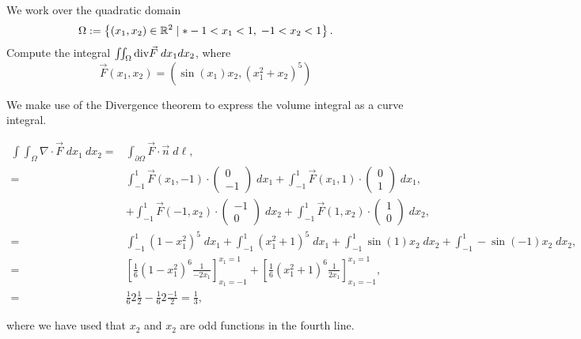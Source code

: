 \documentclass[11pt]{article}
\begin{document}
\begin{exercise}
    We work over the quadratic domain 
    \[
        \Omega := \left\{ (x_1,x_2) \in \bbR^{2} \suchthat* -1 < x_1 < 1, \; -1 < x_2 < 1 \right\}.
    \]
    Compute the integral $\iint_\Omega \mathrm{div} \vec F \;dx_1dx_2$, where 
    \[
        \vec F(x_1,x_2) = \left( \sin(x_1) x_2, \left( x_1^2 + x_2 \right)^5 \right)
    \]
\end{exercise}
\begin{solution}
 We make use of the Divergence theorem to express the volume integral as a curve integral.

\begin{align*}
\int \int_{\Omega} \nabla \cdot \vec{F} \;d x_1 \:d x_2 =&\int_{\partial \Omega}\vec{F}\cdot\vec{n} \;d\ell,\\
=&\int_{-1}^1 \vec{F}(x_1,-1)\cdot\begin{pmatrix}0\\-1\end{pmatrix} \;dx_1 + \int_{-1}^1 \vec{F}(x_1,1)\cdot\begin{pmatrix}0\\1\end{pmatrix} \;dx_1,\\
& + \int_{-1}^1 \vec{F}(-1,x_2)\cdot\begin{pmatrix}-1\\0\end{pmatrix} \;dx_2 + \int_{-1}^1 \vec{F}(1,x_2)\cdot\begin{pmatrix}1\\0\end{pmatrix} \;dx_2,\\
=&\int_{-1}^1 (1-x_1^ 2)^ 5 \;dx_1 + \int_{-1}^1 (x_1^2 + 1)^ 5 \;dx_1 + \int_{-1}^1 \sin(1)x_2\;dx_2 +  \int_{-1}^1 -\sin(-1)x_2\;dx_2,\\
=&  \left[\frac{1}{6}(1-x_1^ 2)^ 6 \frac{1}{-2x_1} \right]_{x_1 = -1}^{x_1 = 1} + \left[\frac{1}{6}(x_1^ 2 + 1)^ 6 \frac{1}{2x_1} \right]_{x_1 = -1}^{x_1 = 1},\\
=& \frac{1}{6} 2 \frac{1}{2} - \frac{1}{6} 2 \frac{-1}{2} = \frac{1}{3},
\end{align*}

where we have used that $x_2$ and $x_2$ are odd functions in the fourth line. 
\end{solution}
\end{document}
